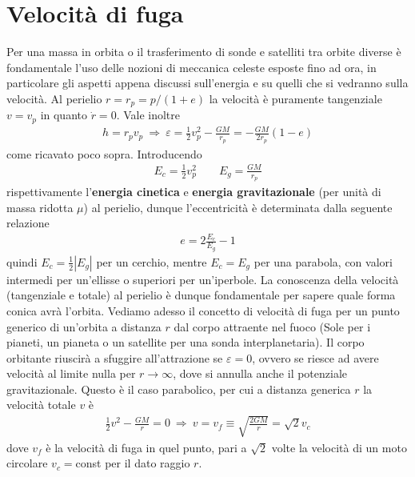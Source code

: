 \documentclass[a4paper, oneside]{book}
\begin{document}
\section{Velocità di fuga}
Per una massa in orbita o il trasferimento di sonde e satelliti tra orbite diverse
è fondamentale l'uso delle nozioni di meccanica celeste 
esposte fino ad ora, in particolare gli aspetti appena discussi sull'energia e su quelli 
che si vedranno sulla velocità. Al perielio $r = r_p = p/(1 + e)$ la 
velocità è puramente 
tangenziale $v = v_p$ in quanto $\dot{r} = 0$. Vale inoltre 
\begin{gather*}
    h = r_p v_p \ \Longrightarrow \ \varepsilon = \frac{1}{2}v_p^{2} - \frac{GM}{r_p} = - \frac{GM}{2r_p}(1 - e)
\end{gather*} 
come ricavato poco sopra. Introducendo 
\begin{gather*}
    E_c = \frac{1}{2}v_p^{2} \qquad E_g = \frac{GM}{r_p}
\end{gather*}
rispettivamente l'\textbf{energia cinetica} e \textbf{energia gravitazionale} (per unità di massa ridotta $\mu$)
al perielio, dunque l'eccentricità è determinata dalla seguente relazione
\begin{gather*}
    e = 2\frac{E_c}{E_g} - 1
\end{gather*}
quindi $E_c = \frac{1}{2}\left| E_g \right|$ per un cerchio, 
mentre $E_c = E_g$ per una parabola, con valori intermedi per un'ellisse
o superiori per un'iperbole. La conoscenza della velocità (tangenziale e totale)
al perielio è dunque fondamentale per sapere quale forma conica avrà l'orbita.
Vediamo adesso il concetto di velocità di fuga per un punto generico di un'orbita 
a distanza $r$ dal corpo attraente nel fuoco (Sole per i pianeti, un pianeta o un satellite
per una sonda interplanetaria). Il corpo orbitante riuscirà a sfuggire all'attrazione
se $\varepsilon = 0$, ovvero se riesce ad avere velocità al limite nulla per $r \to \infty$, dove 
si annulla anche il potenziale gravitazionale. Questo è 
il caso parabolico, per cui a distanza generica $r$ la velocità totale $v$ è
\begin{gather*}
    \frac{1}{2}v^{2} - \frac{GM}{r} = 0 \ \Longrightarrow \ v = v_f \equiv \sqrt{\frac{2GM}{r}} = \sqrt{2} v_c  
\end{gather*} 
dove $v_f$ è la velocità di fuga in quel punto, pari a $\sqrt{2}$ volte
la velocità di un moto circolare $v_c = $const per il dato raggio $r$. 
\end{document}
